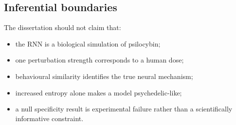 \subsection{Inferential boundaries}

The dissertation should not claim that:
\begin{itemize}[leftmargin=*]
  \item the RNN is a biological simulation of psilocybin;
  \item one perturbation strength corresponds to a human dose;
  \item behavioural similarity identifies the true neural mechanism;
  \item increased entropy alone makes a model psychedelic-like;
  \item a null specificity result is experimental failure rather than a
        scientifically informative constraint.
\end{itemize}
